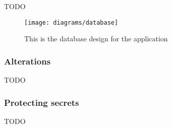 {TODO}

\begin{figure}[H]
    \centering
    \texttt{[image: diagrams/database]}
    \caption{This is the database design for the application}
    \label{fig:diagram_database_image}
\end{figure} 
\noindent

\subsubsection*{Alterations}

{TODO}

\subsubsection*{Protecting secrets}

{TODO}